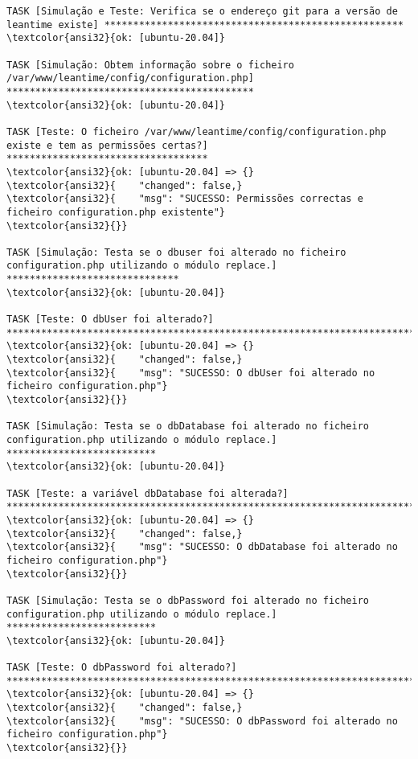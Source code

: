 \documentclass{scrartcl}
\begin{document}
\begin{Verbatim}
TASK [Simulação e Teste: Verifica se o endereço git para a versão de leantime existe] ****************************************************
\textcolor{ansi32}{ok: [ubuntu-20.04]}

TASK [Simulação: Obtem informação sobre o ficheiro /var/www/leantime/config/configuration.php] *******************************************
\textcolor{ansi32}{ok: [ubuntu-20.04]}

TASK [Teste: O ficheiro /var/www/leantime/config/configuration.php existe e tem as permissões certas?] ***********************************
\textcolor{ansi32}{ok: [ubuntu-20.04] => {}
\textcolor{ansi32}{    "changed": false,}
\textcolor{ansi32}{    "msg": "SUCESSO: Permissões correctas e ficheiro configuration.php existente"}
\textcolor{ansi32}{}}

TASK [Simulação: Testa se o dbuser foi alterado no ficheiro configuration.php utilizando o módulo replace.] ******************************
\textcolor{ansi32}{ok: [ubuntu-20.04]}

TASK [Teste: O dbUser foi alterado?] *****************************************************************************************************
\textcolor{ansi32}{ok: [ubuntu-20.04] => {}
\textcolor{ansi32}{    "changed": false,}
\textcolor{ansi32}{    "msg": "SUCESSO: O dbUser foi alterado no ficheiro configuration.php"}
\textcolor{ansi32}{}}

TASK [Simulação: Testa se o dbDatabase foi alterado no ficheiro configuration.php utilizando o módulo replace.] **************************
\textcolor{ansi32}{ok: [ubuntu-20.04]}

TASK [Teste: a variável dbDatabase foi alterada?] ****************************************************************************************
\textcolor{ansi32}{ok: [ubuntu-20.04] => {}
\textcolor{ansi32}{    "changed": false,}
\textcolor{ansi32}{    "msg": "SUCESSO: O dbDatabase foi alterado no ficheiro configuration.php"}
\textcolor{ansi32}{}}

TASK [Simulação: Testa se o dbPassword foi alterado no ficheiro configuration.php utilizando o módulo replace.] **************************
\textcolor{ansi32}{ok: [ubuntu-20.04]}

TASK [Teste: O dbPassword foi alterado?] *************************************************************************************************
\textcolor{ansi32}{ok: [ubuntu-20.04] => {}
\textcolor{ansi32}{    "changed": false,}
\textcolor{ansi32}{    "msg": "SUCESSO: O dbPassword foi alterado no ficheiro configuration.php"}
\textcolor{ansi32}{}}


\end{Verbatim}
\end{document}
